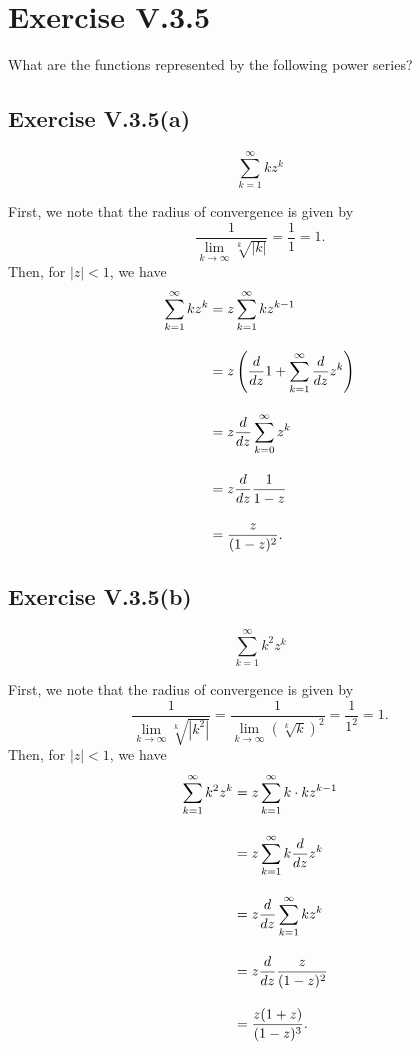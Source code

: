 \documentclass[12pt]{article}
\newenvironment{problem}
    {\begin{lrbox}{\mybox}\begin{minipage}{0.98\textwidth}}
    {\end{minipage}\end{lrbox}\framebox[\textwidth]{\usebox{\mybox}}}
\newcommand{\klim}{\lim\limits_{k \to \infty}}
\newcommand{\od}[3][1]{\ifx1#1{\frac{d #2}{d #3}}\else{\frac{d^{#1}#2}{d #3^{#1}}}\fi}
\begin{document}
\newpage
\section{Exercise V.3.5}
\begin{problem}
    What are the functions represented by the following power series?
\end{problem}

\subsection{Exercise V.3.5(a)}
\begin{problem}
    \[
        \sum_{k=1}^\infty k z^k
    \]
\end{problem}
\medskip

First, we note that the radius of convergence is given by
\[
    \frac{1}{\klim \sqrt[k]{|k|}} = \frac11 = 1.
\]
Then, for $|z| < 1$, we have
\begin{align*}
    \sum_{k=1}^\infty k z^k 
        &= z \sum_{k=1}^\infty k z^{k - 1} \\[1em]
        &= z \left( \od{}{z}1 + \sum_{k=1}^\infty \od{}{z} z^k \right) \\[1em]
        &= z \od{}{z} \sum_{k=0}^\infty z^k \\[1em]
        &= z \od{}{z} \frac{1}{1 - z} \\[1em]
        &= \frac{z}{(1 - z)^2}.
\end{align*}
    
\newpage
\subsection{Exercise V.3.5(b)}
\begin{problem}
    \[
        \sum_{k=1}^\infty k^2 z^k
    \]
\end{problem}
\medskip

First, we note that the radius of convergence is given by
\[
    \frac{1}{\klim \sqrt[k]{|k^2|}} = \frac{1}{\klim \left( \sqrt[k]{k} \right)^2} = \frac{1}{1^2} = 1.
\]
Then, for $|z| < 1$, we have
\begin{align*}
    \sum_{k=1}^\infty k^2 z^k 
        &= z \sum_{k=1}^\infty k \cdot  kz^{k - 1} \\[1em]
        &= z \sum_{k=1}^\infty k\od{}{z} z^k \\[1em]
        &= z \od{}{z} \sum_{k=1}^\infty kz^k \\[1em]
        &= z \od{}{z} \frac{z}{(1 - z)^2} \\[1em]
        &= \frac{z(1 + z)}{(1 - z)^3}.
\end{align*}
\end{document}
